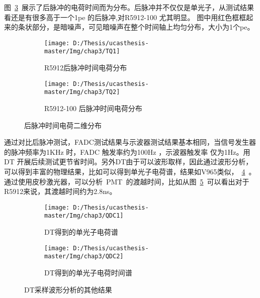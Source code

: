 图~\ref{fig:TQ}~展示了后脉冲的电荷时间而为分布。后脉冲并不仅仅是单光子，从测试结果看还是有很多高于一个1pe 的后脉冲,对R5912-100 尤其明显。
图中用红色框框起来的条状部分，是暗噪声，可见暗噪声在整个时间轴上均匀分布，大小为1个pe。



\begin{figure}[!htbp]
  \centering
  \begin{subfigure}[b]{\MySubFactor\textwidth}
    \texttt{[image: D:/Thesis/ucasthesis-master/Img/chap3/TQ1]}
    \caption{R5912后脉冲时间电荷分布}
    \label{fig:TQ_1}
  \end{subfigure}%
  \quad\quad\quad\quad%
  \begin{subfigure}[b]{\MySubFactor\textwidth}
    \texttt{[image: D:/Thesis/ucasthesis-master/Img/chap3/TQ2]}
    \caption{R5912-100 后脉冲时间电荷分布}
    \label{fig:TQ_2}
  \end{subfigure}
  \caption{后脉冲时间电荷二维分布}
  \label{fig:TQ}
\end{figure}

通过对比后脉冲测试，FADC测试结果与示波器测试结果基本相同，当信号发生器的脉冲频率为1KHz 时，FADC 触发率约为100Hz ，示波器触发率 仅为1Hz。用DT 开展后续测试更节省时间。另外DT由于可以波形取样，因此通过波形分析，可以得到丰富的物理结果，比如可以得到单光子电荷谱，结果如V965类似，~\ref{fig:QDC_1}~。通过使用皮秒激光器，可以分析~PMT~的渡越时间，比如从图~\ref{fig:QDC_2}~可以看出对于R5912来说，其渡越时间约为2.8ns。



\begin{figure}[!htbp]
  \centering
  \begin{subfigure}[b]{\MySubFactor\textwidth}
    \texttt{[image: D:/Thesis/ucasthesis-master/Img/chap3/QDC1]}
    \caption{DT得到的单光子电荷谱}
    \label{fig:QDC_1}
  \end{subfigure}%
  \quad\quad\quad\quad%
  \begin{subfigure}[b]{\MySubFactor\textwidth}
    \texttt{[image: D:/Thesis/ucasthesis-master/Img/chap3/QDC2]}
    \caption{DT得到的单光子电荷时间谱}
    \label{fig:QDC_2}
  \end{subfigure}
  \caption{DT采样波形分析的其他结果}
  \label{fig:QDC}
\end{figure}



